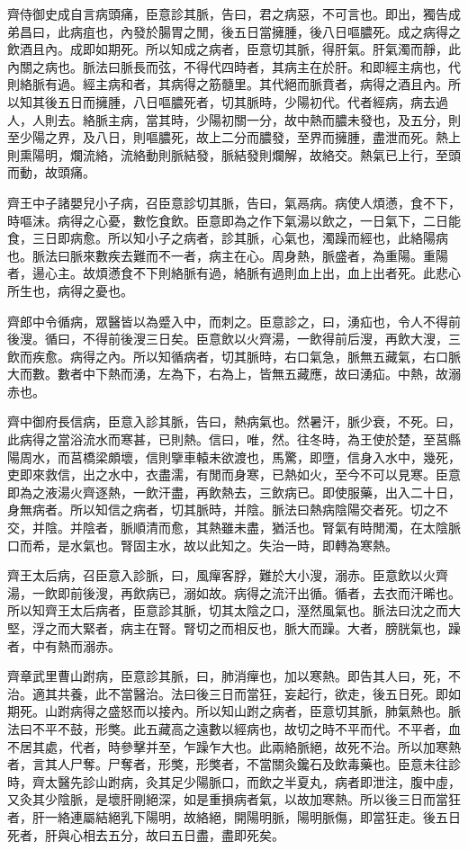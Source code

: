 齊侍御史成自言病頭痛，臣意診其脈，告曰，君之病惡，不可言也。即出，獨告成弟昌曰，此病疽也，內發於腸胃之閒，後五日當擁腫，後八日嘔膿死。成之病得之飲酒且內。成即如期死。所以知成之病者，臣意切其脈，得肝氣。肝氣濁而靜，此內關之病也。脈法曰脈長而弦，不得代四時者，其病主在於肝。和即經主病也，代則絡脈有過。經主病和者，其病得之筋髓里。其代絕而脈賁者，病得之酒且內。所以知其後五日而擁腫，八日嘔膿死者，切其脈時，少陽初代。代者經病，病去過人，人則去。絡脈主病，當其時，少陽初關一分，故中熱而膿未發也，及五分，則至少陽之界，及八日，則嘔膿死，故上二分而膿發，至界而擁腫，盡泄而死。熱上則熏陽明，爛流絡，流絡動則脈結發，脈結發則爛解，故絡交。熱氣已上行，至頭而動，故頭痛。

齊王中子諸嬰兒小子病，召臣意診切其脈，告曰，氣鬲病。病使人煩懣，食不下，時嘔沫。病得之心憂，數忔食飲。臣意即為之作下氣湯以飲之，一日氣下，二日能食，三日即病愈。所以知小子之病者，診其脈，心氣也，濁躁而經也，此絡陽病也。脈法曰脈來數疾去難而不一者，病主在心。周身熱，脈盛者，為重陽。重陽者，逿心主。故煩懣食不下則絡脈有過，絡脈有過則血上出，血上出者死。此悲心所生也，病得之憂也。

齊郎中令循病，眾醫皆以為蹙入中，而刺之。臣意診之，曰，湧疝也，令人不得前後溲。循曰，不得前後溲三日矣。臣意飲以火齊湯，一飲得前后溲，再飲大溲，三飲而疾愈。病得之內。所以知循病者，切其脈時，右口氣急，脈無五藏氣，右口脈大而數。數者中下熱而湧，左為下，右為上，皆無五藏應，故曰湧疝。中熱，故溺赤也。

齊中御府長信病，臣意入診其脈，告曰，熱病氣也。然暑汗，脈少衰，不死。曰，此病得之當浴流水而寒甚，已則熱。信曰，唯，然。往冬時，為王使於楚，至莒縣陽周水，而莒橋梁頗壞，信則擥車轅未欲渡也，馬驚，即墮，信身入水中，幾死，吏即來救信，出之水中，衣盡濡，有閒而身寒，已熱如火，至今不可以見寒。臣意即為之液湯火齊逐熱，一飲汗盡，再飲熱去，三飲病已。即使服藥，出入二十日，身無病者。所以知信之病者，切其脈時，并陰。脈法曰熱病陰陽交者死。切之不交，并陰。并陰者，脈順清而愈，其熱雖未盡，猶活也。腎氣有時閒濁，在太陰脈口而希，是水氣也。腎固主水，故以此知之。失治一時，即轉為寒熱。

齊王太后病，召臣意入診脈，曰，風癉客脬，難於大小溲，溺赤。臣意飲以火齊湯，一飲即前後溲，再飲病已，溺如故。病得之流汗出循。循者，去衣而汗晞也。所以知齊王太后病者，臣意診其脈，切其太陰之口，溼然風氣也。脈法曰沈之而大堅，浮之而大緊者，病主在腎。腎切之而相反也，脈大而躁。大者，膀胱氣也，躁者，中有熱而溺赤。

齊章武里曹山跗病，臣意診其脈，曰，肺消癉也，加以寒熱。即告其人曰，死，不治。適其共養，此不當醫治。法曰後三日而當狂，妄起行，欲走，後五日死。即如期死。山跗病得之盛怒而以接內。所以知山跗之病者，臣意切其脈，肺氣熱也。脈法曰不平不鼓，形獘。此五藏高之遠數以經病也，故切之時不平而代。不平者，血不居其處，代者，時參擊并至，乍躁乍大也。此兩絡脈絕，故死不治。所以加寒熱者，言其人尸奪。尸奪者，形獘，形獘者，不當關灸鑱石及飲毒藥也。臣意未往診時，齊太醫先診山跗病，灸其足少陽脈口，而飲之半夏丸，病者即泄注，腹中虛，又灸其少陰脈，是壞肝剛絕深，如是重損病者氣，以故加寒熱。所以後三日而當狂者，肝一絡連屬結絕乳下陽明，故絡絕，開陽明脈，陽明脈傷，即當狂走。後五日死者，肝與心相去五分，故曰五日盡，盡即死矣。

